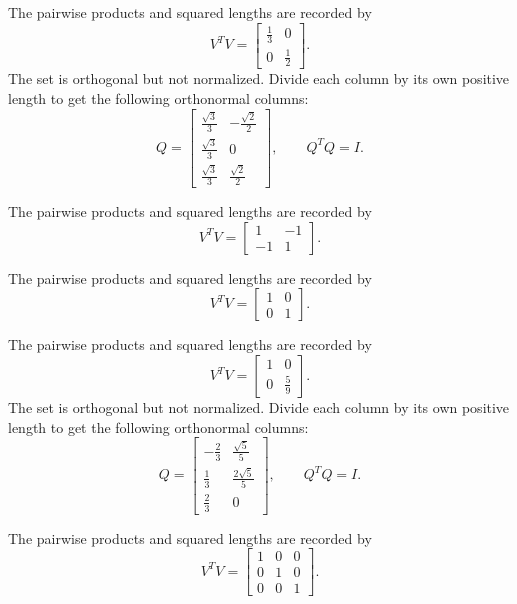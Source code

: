 The pairwise products and squared lengths are recorded by
\[V^TV=\left[\begin{array}{rr}\frac{1}{3}&0\\0&\frac{1}{2}\end{array}\right].\]
The set is orthogonal but not normalized. Divide each column by its own positive length to get the following orthonormal columns:
\[Q=\left[\begin{array}{rr}\frac{\sqrt{3}}{3}&- \frac{\sqrt{2}}{2}\\\frac{\sqrt{3}}{3}&0\\\frac{\sqrt{3}}{3}&\frac{\sqrt{2}}{2}\end{array}\right],\qquad Q^TQ=I.\]

The pairwise products and squared lengths are recorded by
\[V^TV=\left[\begin{array}{rr}1&-1\\-1&1\end{array}\right].\]

The pairwise products and squared lengths are recorded by
\[V^TV=\left[\begin{array}{rr}1&0\\0&1\end{array}\right].\]

The pairwise products and squared lengths are recorded by
\[V^TV=\left[\begin{array}{rr}1&0\\0&\frac{5}{9}\end{array}\right].\]
The set is orthogonal but not normalized. Divide each column by its own positive length to get the following orthonormal columns:
\[Q=\left[\begin{array}{rr}- \frac{2}{3}&\frac{\sqrt{5}}{5}\\\frac{1}{3}&\frac{2 \sqrt{5}}{5}\\\frac{2}{3}&0\end{array}\right],\qquad Q^TQ=I.\]

The pairwise products and squared lengths are recorded by
\[V^TV=\left[\begin{array}{rrr}1&0&0\\0&1&0\\0&0&1\end{array}\right].\]

